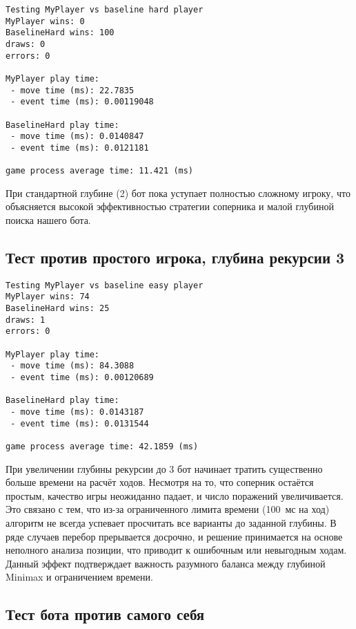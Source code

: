\begin{lstlisting}[caption={Тест против BaselineHard, глубина 2},label={lst:test_hard2},numbers=none]
Testing MyPlayer vs baseline hard player
MyPlayer wins: 0
BaselineHard wins: 100
draws: 0
errors: 0

MyPlayer play time:
 - move time (ms): 22.7835
 - event time (ms): 0.00119048

BaselineHard play time:
 - move time (ms): 0.0140847
 - event time (ms): 0.0121181

game process average time: 11.421 (ms)
\end{lstlisting}

При стандартной глубине (2) бот пока уступает полностью сложному игроку, что объясняется высокой эффективностью стратегии соперника и малой глубиной поиска нашего бота.

\subsection{Тест против простого игрока, глубина рекурсии 3}

\begin{lstlisting}[caption={Тест против BaselineEasy, глубина 3},label={lst:test_easy3},numbers=none]
Testing MyPlayer vs baseline easy player
MyPlayer wins: 74
BaselineHard wins: 25
draws: 1
errors: 0

MyPlayer play time:
 - move time (ms): 84.3088
 - event time (ms): 0.00120689

BaselineHard play time:
 - move time (ms): 0.0143187
 - event time (ms): 0.0131544

game process average time: 42.1859 (ms)
\end{lstlisting}

При увеличении глубины рекурсии до 3 бот начинает тратить существенно больше времени на расчёт ходов. Несмотря на то, что соперник остаётся простым, качество игры неожиданно падает, и число поражений увеличивается. Это связано с тем, что из-за ограниченного лимита времени (100~мс на ход) алгоритм не всегда успевает просчитать все варианты до заданной глубины. В ряде случаев перебор прерывается досрочно, и решение принимается на основе неполного анализа позиции, что приводит к ошибочным или невыгодным ходам. Данный эффект подтверждает важность разумного баланса между глубиной Minimax и ограничением времени.

\subsection{Тест бота против самого себя}

